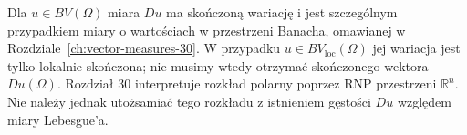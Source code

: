 \begin{uwaga}
Dla $u\in BV(\Omega)$ miara $Du$ ma skończoną wariację
i jest szczególnym przypadkiem miary o wartościach
w przestrzeni Banacha, omawianej w
Rozdziale~\ref{ch:vector-measures-30}.
W przypadku $u\in BV_{\mathrm{loc}}(\Omega)$ jej wariacja
jest tylko lokalnie skończona; nie musimy wtedy otrzymać
skończonego wektora $Du(\Omega)$.
Rozdział 30 interpretuje rozkład polarny poprzez RNP
przestrzeni $\mathbb R^n$. Nie należy jednak utożsamiać
tego rozkładu z istnieniem gęstości $Du$ względem
miary Lebesgue'a.
\end{uwaga}